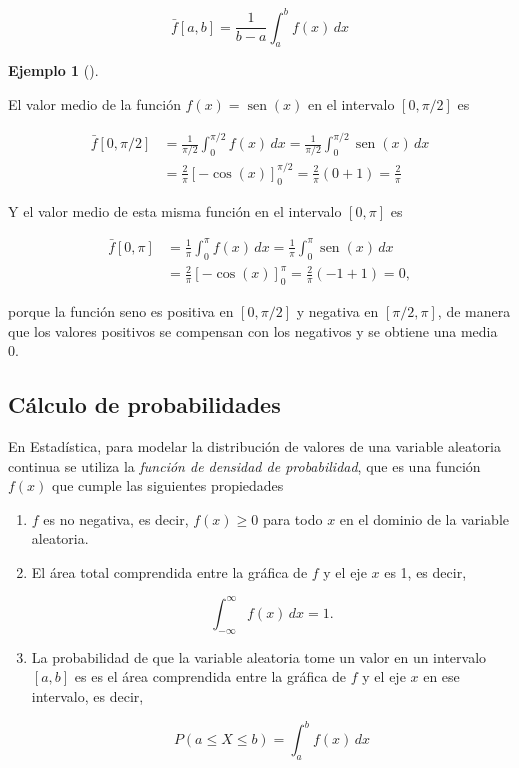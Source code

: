 \documentclass[
  a4paper,
]{scrreport}
\theoremstyle{definition}
\theoremstyle{definition}
\newtheorem{example}{Ejemplo}[chapter]
\theoremstyle{definition}
\theoremstyle{plain}
\theoremstyle{plain}
\theoremstyle{plain}
\theoremstyle{remark}
\begin{document}
\[
\bar f[a,b] = \frac{1}{b-a}\int_a^b f(x)\,dx
\]

\begin{example}[]\protect\hypertarget{exm-valor-medio}{}\label{exm-valor-medio}

El valor medio de la función \(f(x)=\operatorname{sen}(x)\) en el
intervalo \([0,\pi/2]\) es

\begin{align*}
\bar f[0,\pi/2]
&= \frac{1}{\pi/2} \int_0^{\pi/2} f(x)\, dx 
= \frac{1}{\pi/2} \int_0^{\pi/2} \operatorname{sen}(x)\, dx \\
&= \frac{2}{\pi}[-\cos(x)]_0^{\pi/2}
= \frac{2}{\pi}(0+1)
= \frac{2}{\pi}
\end{align*}

Y el valor medio de esta misma función en el intervalo \([0,\pi]\) es

\begin{align*}
\bar f[0,\pi] 
&= \frac{1}{\pi} \int_0^{\pi} f(x)\, dx 
= \frac{1}{\pi} \int_0^{\pi} \operatorname{sen}(x)\, dx \\
&= \frac{2}{\pi}[-\cos(x)]_0^{\pi}
= \frac{2}{\pi}(-1+1)
= 0,
\end{align*}

porque la función seno es positiva en \([0,\pi/2]\) y negativa en
\([\pi/2, \pi]\), de manera que los valores positivos se compensan con
los negativos y se obtiene una media 0.

\end{example}

\subsection{Cálculo de
probabilidades}\label{cuxe1lculo-de-probabilidades}

En Estadística, para modelar la distribución de valores de una variable
aleatoria continua se utiliza la \emph{función de densidad de
probabilidad}, que es una función \(f(x)\) que cumple las siguientes
propiedades

\begin{enumerate}
\def\labelenumi{\arabic{enumi}.}
\item
  \(f\) es no negativa, es decir, \(f(x)\geq 0\) para todo \(x\) en el
  dominio de la variable aleatoria.
\item
  El área total comprendida entre la gráfica de \(f\) y el eje \(x\) es
  1, es decir,

  \[
  \int_{-\infty}^{\infty} f(x)\,dx = 1.
  \]
\item
  La probabilidad de que la variable aleatoria tome un valor en un
  intervalo \([a,b]\) es es el área comprendida entre la gráfica de
  \(f\) y el eje \(x\) en ese intervalo, es decir,

  \[
  P(a\leq X\leq b) = \int_a^b f(x)\,dx
  \]
\end{enumerate}
\end{document}
